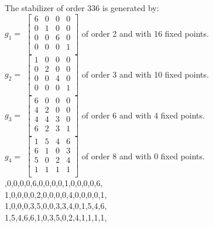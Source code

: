 The stabilizer of order $336$ is generated by:\\
$g_{1} = $ $\left[
\begin{array}{*{4}{r}}
6 & 0 & 0 & 0\\
0 & 1 & 0 & 0\\
0 & 0 & 6 & 0\\
0 & 0 & 0 & 1\\
\end{array}
\right]
$ of order 2 and with 16 fixed points.\\
$g_{2} = $ $\left[
\begin{array}{*{4}{r}}
1 & 0 & 0 & 0\\
0 & 2 & 0 & 0\\
0 & 0 & 4 & 0\\
0 & 0 & 0 & 1\\
\end{array}
\right]
$ of order 3 and with 10 fixed points.\\
$g_{3} = $ $\left[
\begin{array}{*{4}{r}}
6 & 0 & 0 & 0\\
4 & 2 & 0 & 0\\
4 & 4 & 3 & 0\\
6 & 2 & 3 & 1\\
\end{array}
\right]
$ of order 6 and with 4 fixed points.\\
$g_{4} = $ $\left[
\begin{array}{*{4}{r}}
1 & 5 & 4 & 6\\
6 & 1 & 0 & 3\\
5 & 0 & 2 & 4\\
1 & 1 & 1 & 1\\
\end{array}
\right]
$ of order 8 and with 0 fixed points.\\

,0,0,0,0,6,0,0,0,0,1,0,0,0,0,6,\\
1,0,0,0,0,2,0,0,0,0,4,0,0,0,0,1,\\
1,0,0,0,3,5,0,0,3,3,4,0,1,5,4,6,\\
1,5,4,6,6,1,0,3,5,0,2,4,1,1,1,1,\\
